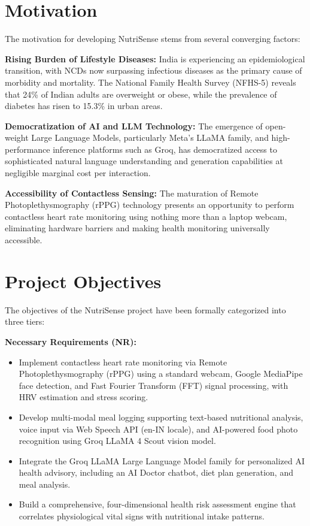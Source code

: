 \documentclass[12pt,a4paper]{report}
\begin{document}
\section{Motivation}
The motivation for developing NutriSense stems from several converging factors:

\textbf{Rising Burden of Lifestyle Diseases:} India is experiencing an epidemiological transition, with NCDs now surpassing infectious diseases as the primary cause of morbidity and mortality. The National Family Health Survey (NFHS-5) reveals that 24\% of Indian adults are overweight or obese, while the prevalence of diabetes has risen to 15.3\% in urban areas.

\textbf{Democratization of AI and LLM Technology:} The emergence of open-weight Large Language Models, particularly Meta's LLaMA family, and high-performance inference platforms such as Groq, has democratized access to sophisticated natural language understanding and generation capabilities at negligible marginal cost per interaction.

\textbf{Accessibility of Contactless Sensing:} The maturation of Remote Photoplethysmography (rPPG) technology presents an opportunity to perform contactless heart rate monitoring using nothing more than a laptop webcam, eliminating hardware barriers and making health monitoring universally accessible.

\section{Project Objectives}
The objectives of the NutriSense project have been formally categorized into three tiers:

\textbf{Necessary Requirements (NR):}
\begin{itemize}[leftmargin=2cm]
  \item[\textbf{NR1:}] Implement contactless heart rate monitoring via Remote Photoplethysmography (rPPG) using a standard webcam, Google MediaPipe face detection, and Fast Fourier Transform (FFT) signal processing, with HRV estimation and stress scoring.
  \item[\textbf{NR2:}] Develop multi-modal meal logging supporting text-based nutritional analysis, voice input via Web Speech API (en-IN locale), and AI-powered food photo recognition using Groq LLaMA 4 Scout vision model.
  \item[\textbf{NR3:}] Integrate the Groq LLaMA Large Language Model family for personalized AI health advisory, including an AI Doctor chatbot, diet plan generation, and meal analysis.
  \item[\textbf{NR4:}] Build a comprehensive, four-dimensional health risk assessment engine that correlates physiological vital signs with nutritional intake patterns.
\end{itemize}
\end{document}
